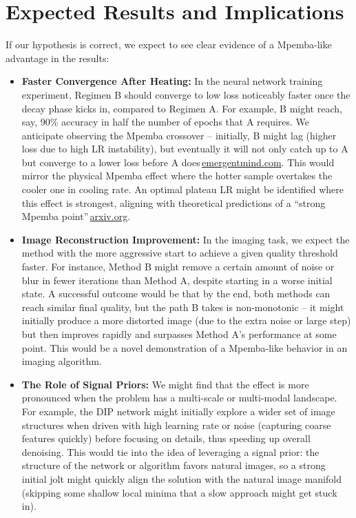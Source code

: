 \documentclass[11pt]{article}
\begin{document}
\section{Expected Results and Implications}

If our hypothesis is correct, we expect to see clear evidence of a Mpemba-like advantage in the results:

\begin{itemize}
  \item \textbf{Faster Convergence After Heating:} In the neural network training experiment, Regimen B should converge to low loss noticeably faster once the decay phase kicks in, compared to Regimen A. For example, B might reach, say, 90\% accuracy in half the number of epochs that A requires. We anticipate observing the Mpemba crossover -- initially, B might lag (higher loss due to high LR instability), but eventually it will not only catch up to A but converge to a lower loss before A does\,\href{https://www.emergentmind.com/topics/warmup-stable-decay-wsd-schedules#:~:text=Notably%2C the greatest loss reduction,May 2025 %2C  25}{emergentmind.com}. This would mirror the physical Mpemba effect where the hotter sample overtakes the cooler one in cooling rate. An optimal plateau LR might be identified where this effect is strongest, aligning with theoretical predictions of a ``strong Mpemba point''\,\href{https://arxiv.org/html/2507.04206v1#:~:text=show that for certain loss,LLMs with minimal hyperparameter sweep}{arxiv.org}.
  \item \textbf{Image Reconstruction Improvement:} In the imaging task, we expect the method with the more aggressive start to achieve a given quality threshold faster. For instance, Method B might remove a certain amount of noise or blur in fewer iterations than Method A, despite starting in a worse initial state. A successful outcome would be that by the end, both methods can reach similar final quality, but the path B takes is non-monotonic -- it might initially produce a more distorted image (due to the extra noise or large step) but then improves rapidly and surpasses Method A's performance at some point. This would be a novel demonstration of a Mpemba-like behavior in an imaging algorithm.
  \item \textbf{The Role of Signal Priors:} We might find that the effect is more pronounced when the problem has a multi-scale or multi-modal landscape. For example, the DIP network might initially explore a wider set of image structures when driven with high learning rate or noise (capturing coarse features quickly) before focusing on details, thus speeding up overall denoising. This would tie into the idea of leveraging a signal prior: the structure of the network or algorithm favors natural images, so a strong initial jolt might quickly align the solution with the natural image manifold (skipping some shallow local minima that a slow approach might get stuck in).

\end{itemize}
\end{document}
